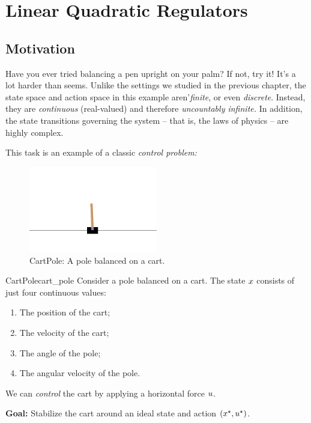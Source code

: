 \documentclass[../main/main]{subfiles}
\begin{document}
    
\tableofcontents

\chapter[LQR]{Linear Quadratic Regulators}

\section{Motivation}

Have you ever tried balancing a pen upright on your palm?
If not, try it! It's a lot harder than seems.
Unlike the settings we studied in the previous chapter,
the state space and action space in this example aren'\hi \emph{finite}, or even \emph{discrete}.
Instead, they are \emph{continuous} (real-valued) and therefore \emph{uncountably infinite.}
In addition, the state transitions governing the system -- that is, the laws of physics --
are highly complex.

This task is an example of a classic \emph{control problem:}

\begin{figure}[h]
    \centering
    \includegraphics[width=0.5\textwidth]{cart_pole.png}
    \caption{CartPole: A pole balanced on a cart.}
    \label{fig:cart_pole}
\end{figure}

\begin{example}{CartPole}{cart_pole}
    Consider a pole balanced on a cart.
    The state $x$ consists of just four continuous values:

    \begin{enumerate}
        \item The position of the cart;
        \item The velocity of the cart;
        \item The angle of the pole;
        \item The angular velocity of the pole.
    \end{enumerate}

    We can \emph{control} the cart by applying a horizontal force $u$.

    \textbf{Goal:} Stabilize the cart around an ideal state and action $(x^\star, u^\star)$.
\end{example}
\end{document}
